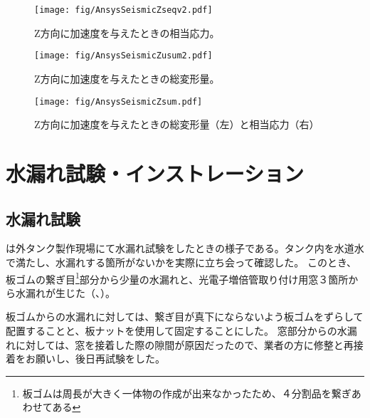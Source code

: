 \begin{figure}[htbp]
\begin{minipage}{0.47\textwidth}
\centering
\texttt{[image: fig/AnsysSeismicZseqv2.pdf]}
\caption[Z方向に加速度を与えたときの相当応力]{Z方向に加速度を与えたときの相当応力。}
\label{SEQVZ}
\end{minipage}
\hfil
\begin{minipage}{0.47\textwidth}
\begin{center}
\texttt{[image: fig/AnsysSeismicZusum2.pdf]}
\caption[Z方向に加速度を与えたときの総変形量]{Z方向に加速度を与えたときの総変形量。}
\label{USUMZ}
\end{center}
\end{minipage}
\end{figure}
\fi%


\begin{figure}[htb]
\centering
\texttt{[image: fig/AnsysSeismicZsum.pdf]}
\caption[Z方向に加速度を与えたときの総変形量と相当応力]{Z方向に加速度を与えたときの総変形量（左）と相当応力（右）}
\label{SeismicZ}
\end{figure}

\newpage
\section{水漏れ試験・インストレーション}

\subsection{水漏れ試験}
は外タンク製作現場にて水漏れ試験をしたときの様子である。タンク内を水道水で満たし、水漏れする箇所がないかを実際に立ち会って確認した。
このとき、板ゴムの繋ぎ目\footnote{板ゴムは周長が大きく一体物の作成が出来なかったため、４分割品を繋ぎあわせてある}部分から少量の水漏れと、光電子増倍管取り付け用窓３箇所から水漏れが生じた（、）。

板ゴムからの水漏れに対しては、繋ぎ目が真下にならないよう板ゴムをずらして配置することと、板ナットを使用して固定することにした。
窓部分からの水漏れに対しては、窓を接着した際の隙間が原因だったので、業者の方に修整と再接着をお願いし、後日再試験をした。

